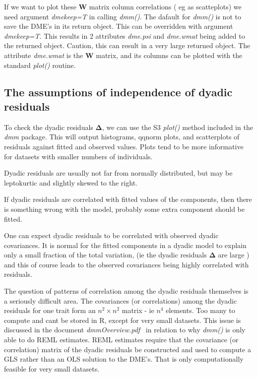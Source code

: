 \documentclass[titlepage,a4paper,12pt]{article}  %
\begin{document}
If we want to plot these $\bm{W}$ matrix column correlations ( eg as scatteplots) we need argument {\em dmekeep=T} in calling {\em dmm()}. The dafault for {\em dmm()} is not to save the DME's in its return object. This can be overridden with argument {\em dmekeep=T}. This results in 2 attributes {\em dme.psi} and {\em dme.wmat} being added to the returned object. Caution, this can result in a very large returned object. The attribute {\em dme.wmat} is the $\bm{W}$ matrix, and its columns can be plotted with the standard {\em plot()} routine.

\subsection{The assumptions of independence of dyadic residuals}
To check the dyadic residuals $\bm{\Delta}$, we can use the S3 {\em plot()} method included in the {\em dmm} package. This will output histograms, qqnorm plots, and scatterplots of residuals against fitted and observed values. Plots tend to be more informative for datasets with smaller numbers of individuals.

Dyadic residuals are usually not far from normally distributed, but may be leptokurtic and slightly skewed to the right.

If dyadic residuals are correlated with fitted values of the components, then there is something wrong with the model, probably some extra component should be fitted. 

One can expect dyadic residuals to be correlated with observed dyadic covariances. It is normal for the fitted components in a dyadic model to explain only a small fraction of the total variation, (ie the dyadic residuals $\bm\Delta$ are large ) and this of course leads to the observed covariances being highly correlated with residuals.

The question of patterns of correlation among the dyadic residuals themselves is a seriously difficult area. The covariances (or correlations) among the dyadic residuals for one trait form an $n^{2} \times n^{2}$ matrix - ie $n^{4}$ elements. Too many to compute and cant be stored in R, except for very small datasets. This issue is discussed in the document {\em dmmOverview.pdf}~\cite{jack:15} in relation to why {\em dmm()} is only able to do REML estimates. REML estimates require that the covariance (or correlation) matrix of the dyadic residuals be constructed and used to compute a GLS rather than an OLS solution to the DME's. That is only computationally feasible for very small datasets.
\end{document}
